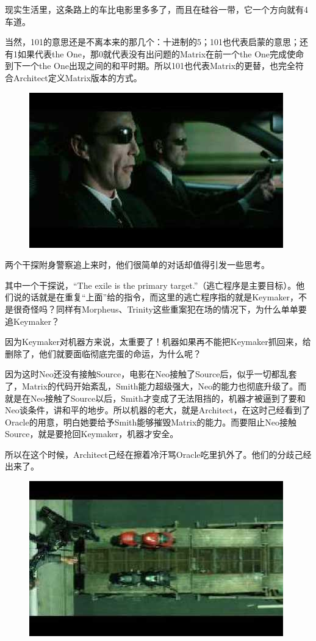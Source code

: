 \documentclass[UTF8]{ctexart}
\begin{document}
现实生活里，这条路上的车比电影里多多了，而且在硅谷一带，它一个方向就有4车道。

当然，101的意思还是不离本来的那几个：十进制的5；101也代表启蒙的意思；还有1如果代表the One，那0就代表没有出问题的Matrix在前一个the One完成使命到下一个the One出现之间的和平时期。所以101也代表Matrix的更替，也完全符合Architect定义Matrix版本的方式。

\begin{figure}[htb]
\centering
\includegraphics[width=0.5\linewidth]{fig/read_reloaded-133}
\end{figure}

两个干探附身警察追上来时，他们很简单的对话却值得引发一些思考。

其中一个干探说，“The exile is the primary target.”（逃亡程序是主要目标）。他们说的话就是在重复“上面”给的指令，而这里的逃亡程序指的就是Keymaker，不是很奇怪吗？同样有Morpheus、Trinity这些重案犯在场的情况下，为什么单单要追Keymaker？

因为Keymaker对机器方来说，太重要了！机器如果再不能把Keymaker抓回来，给删除了，他们就要面临彻底完蛋的命运，为什么呢？

因为这时Neo还没有接触Source，电影在Neo接触了Source后，似乎一切都乱套了，Matrix的代码开始紊乱，Smith能力超级强大，Neo的能力也彻底升级了。而就是在Neo接触了Source以后，Smith才变成了无法阻挡的，机器才被逼到了要和Neo谈条件，讲和平的地步。所以机器的老大，就是Architect，在这时己经看到了Oracle的用意，明白她要给予Smith能够摧毁Matrix的能力。而要阻止Neo接触Source，就是要抢回Keymaker，机器才安全。

所以在这个时候，Architect己经在擦着冷汗骂Oracle吃里扒外了。他们的分歧己经出来了。

\begin{figure}[htb]
\centering
\includegraphics[width=0.5\linewidth]{fig/read_reloaded-134}
\end{figure}
\end{document}
